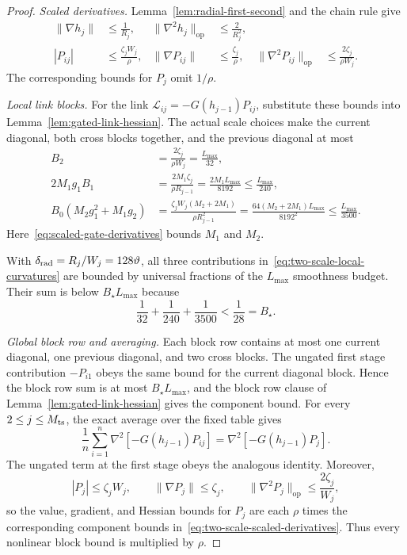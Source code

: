 \documentclass{article}
\theoremstyle{definition}
\newcommand{\op}{\mathrm{op}}
\begin{document}
\begin{proof}
\emph{Scaled derivatives.}
Lemma~\ref{lem:radial-first-second} and the chain rule give
\begin{align}
 \|\nabla h_j\|&\le\frac1{R_j},
 &\|\nabla^2h_j\|_{\op}&\le\frac2{R_j^2},\nonumber\\
 |P_{ij}|&\le\frac{\zeta_jW_j}{\rho},
 &\|\nabla P_{ij}\|&\le\frac{\zeta_j}{\rho},
 &\|\nabla^2P_{ij}\|_{\op}&\le\frac{2\zeta_j}{\rho W_j}.
 \label{eq:two-scale-scaled-derivatives}
\end{align}
The corresponding bounds for $P_j$ omit $1/\rho$.

\emph{Local link blocks.}
For the link
$\mathcal L_{ij}=-G(h_{j-1})P_{ij}$, substitute these bounds into
Lemma~\ref{lem:gated-link-hessian}.  The actual scale choices make the current
diagonal, both cross blocks together, and the previous diagonal at most
\begin{align}
 B_2
 &=\frac{2\zeta_j}{\rho W_j}
 =\frac{L_{\max}}{32},\nonumber\\
 2M_1g_1B_1
 &=\frac{2M_1\zeta_j}{\rho R_{j-1}}
 =\frac{2M_1L_{\max}}{8192}
 \le\frac{L_{\max}}{240},\nonumber\\
 B_0(M_2g_1^2+M_1g_2)
 &=\frac{\zeta_jW_j(M_2+2M_1)}{\rho R_{j-1}^2}
 =\frac{64(M_2+2M_1)L_{\max}}{8192^2}
 \le\frac{L_{\max}}{3500}.
 \label{eq:two-scale-local-curvatures}
\end{align}
Here~\eqref{eq:scaled-gate-derivatives} bounds $M_1$ and $M_2$.

With $\delta_{\rm rad}=R_j/W_j=128\vartheta$, all three contributions
in~\eqref{eq:two-scale-local-curvatures} are bounded by universal fractions of
the $L_{\max}$ smoothness budget.  Their sum is below $B_\star L_{\max}$ because
\begin{equation}
 \frac1{32}+\frac1{240}+\frac1{3500}<\frac1{28}=B_\star.
 \label{eq:two-scale-curvature-fractions}
\end{equation}

\emph{Global block row and averaging.}
Each block row contains at most one current diagonal, one previous diagonal,
and two cross blocks.  The ungated first stage contribution $-P_{i1}$ obeys the same
bound for the current diagonal block.  Hence the block row sum is at most
$B_\star L_{\max}$, and the block row clause of
Lemma~\ref{lem:gated-link-hessian} gives the component bound.  For every
$2\le j\le M_{\rm ts}$, the exact average over the fixed table gives
\begin{equation}
 \frac1n\sum_{i=1}^n
 \nabla^2\!\left[-G(h_{j-1})P_{ij}\right]
 =\nabla^2\!\left[-G(h_{j-1})P_j\right].
 \label{eq:two-scale-average-link-hessian}
\end{equation}
The ungated term at the first stage obeys the analogous identity.  Moreover,
\begin{equation}
 |P_j|\le\zeta_jW_j,
 \qquad \|\nabla P_j\|\le\zeta_j,
 \qquad \|\nabla^2P_j\|_{\op}\le\frac{2\zeta_j}{W_j},
 \label{eq:two-scale-average-derivatives}
\end{equation}
so the value, gradient, and Hessian bounds for $P_j$ are each $\rho$ times the
corresponding component bounds in~\eqref{eq:two-scale-scaled-derivatives}.
Thus every nonlinear block bound is multiplied by $\rho$.
\end{proof}
\end{document}
